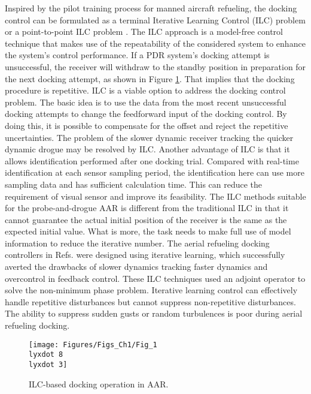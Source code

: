 Inspired by the pilot training process for manned aircraft refueling,
the docking control can be formulated as a terminal Iterative Learning
Control (ILC) problem or a point-to-point ILC problem\cite{Lin1998Iterative}
\cite{Sun1999Iterative}. The ILC approach is a model-free control
technique that makes use of the repeatability of the considered system
to enhance the system's control performance. If a PDR system's docking
attempt is unsuccessful, the receiver will withdraw to the standby
position in preparation for the next docking attempt, as shown in
Figure \ref{Fig_1.8-3}. That implies that the docking procedure is
repetitive. ILC is a viable option to address the docking control
problem. The basic idea is to use the data from the most recent unsuccessful
docking attempts to change the feedforward input of the docking control.
By doing this, it is possible to compensate for the offset and reject
the repetitive uncertainties. The problem of the slower dynamic receiver
tracking the quicker dynamic drogue may be resolved by ILC. Another
advantage of ILC is that it allows identification performed after
one docking trial. Compared with real-time identification at each
sensor sampling period, the identification here can use more sampling
data and has sufficient calculation time. This can reduce the requirement
of visual sensor and improve its feasibility. The ILC methods suitable
for the probe-and-drogue AAR is different from the traditional ILC
in that it cannot guarantee the actual initial position of the receiver
is the same as the expected initial value. What is more, the task
needs to make full use of model information to reduce the iterative
number. The aerial refueling docking controllers in Refs.\cite{dai2018terminal,ren2019reliable,jinrui2020docking}
were designed using iterative learning, which successfully averted
the drawbacks of slower dynamics tracking faster dynamics and overcontrol
in feedback control. These ILC techniques used an adjoint operator
to solve the non-minimum phase problem. Iterative learning control
can effectively handle repetitive disturbances but cannot suppress
non-repetitive disturbances. The ability to suppress sudden gusts
or random turbulences is poor during aerial refueling docking. 
\begin{figure}
\begin{centering}
\texttt{[image: Figures/Figs\_Ch1/Fig\_1\\lyxdot 8\\lyxdot 3]}
\par\end{centering}
\caption{ILC-based docking operation in AAR.\cite{jinrui2020docking}}

\centering{}\label{Fig_1.8-3}
\end{figure}


